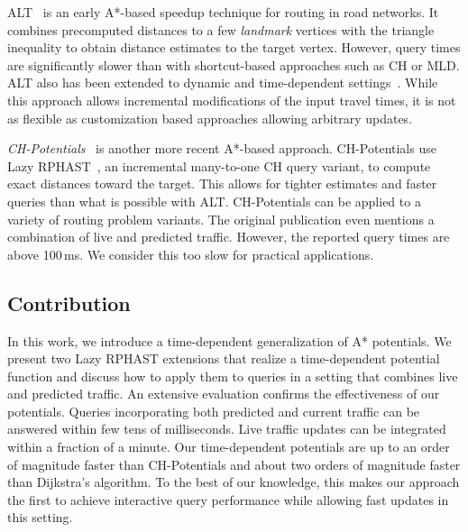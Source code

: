 \documentclass[a4paper,UKenglish,cleveref, autoref, thm-restate]{lipics-v2021}
\begin{document}
ALT~\cite{gh-cspas-05,gw-cppsp-05} is an early A*-based speedup technique for routing in road networks.
It combines precomputed distances to a few \emph{landmark} vertices with the triangle inequality to obtain distance estimates to the target vertex.
However, query times are significantly slower than with shortcut-based approaches such as CH or MLD.
ALT also has been extended to dynamic and time-dependent settings~\cite{dn-crdtd-12}. %
While this approach allows incremental modifications of the input travel times, it is not as flexible as customization based approaches allowing arbitrary updates.

\emph{CH-Potentials}~\cite{strasser_et_al:LIPIcs.SEA.2021.6} is another more recent A*-based approach.
CH-Potentials use Lazy RPHAST~\cite{strasser_et_al:LIPIcs.SEA.2021.6}, an incremental many-to-one CH query variant, to compute exact distances toward the target.
This allows for tighter estimates and faster queries than what is possible with ALT.
CH-Potentials can be applied to a variety of routing problem variants.
The original publication even mentions a combination of live and predicted traffic.
However, the reported query times are above 100\,ms.
We consider this too slow for practical applications.

\subsection{Contribution}

In this work, we introduce a time-dependent generalization of A* potentials.
We present two Lazy RPHAST extensions that realize a time-dependent potential function and discuss how to apply them to queries in a setting that combines live and predicted traffic.
An extensive evaluation confirms the effectiveness of our potentials.
Queries incorporating both predicted and current traffic can be answered within few tens of milliseconds.
Live traffic updates can be integrated within a fraction of a minute.
Our time-dependent potentials are up to an order of magnitude faster than CH-Potentials and about two orders of magnitude faster than Dijkstra's algorithm.
To the best of our knowledge, this makes our approach the first to achieve interactive query performance while allowing fast updates in this setting.
\end{document}
